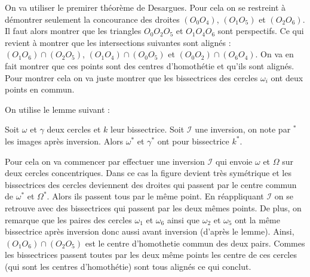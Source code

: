 \begin{sol}



On va utiliser le premirer théorème de Desargues. Pour cela on se restreint à démontrer seulement la concourance des droites $(O_0O_4)$, $(O_1O_5)$ et $(O_2O_6)$. Il faut alors montrer que les triangles $O_0O_2O_5$ et $O_1O_4O_6$ sont perspectifs. Ce qui revient à montrer que les intersections suivantes sont alignés : $(O_1O_6)\cap(O_2O_5)$, $(O_1O_4)\cap (O_0O_5)$ et $(O_0O_2)\cap (O_6O_4)$. On va en fait montrer que ces points sont des centres d'homothétie et qu'ils sont alignés. Pour montrer cela on va juste montrer que les bissectrices des cercles $\omega_i$ ont deux points en commun.

On utilise le lemme suivant :

\begin{lem}
Soit $\omega$ et $\gamma$ deux cercles et $k$ leur bissectrice. Soit $\mathcal{I}$ une inversion, on note par $^*$ les images après inversion. Alors $\omega^*$ et $\gamma^*$ ont pour bissectrice $k^*$.
\end{lem}

Pour cela on va commencer par effectuer une inversion $\mathcal{I}$ qui envoie $\omega$ et $\Omega$ sur deux cercles concentriques. Dans ce cas la figure devient très symétrique et les bissectrices des cercles deviennent des droites qui passent par le centre commun de $\omega^*$ et $\Omega^*$. Alors ils passent tous par le même point. En réappliquant $\mathcal{I}$ on se retrouve avec des bissectrices qui passent par les deux mêmes points. De plus, on remarque que les paires des cercles $\omega_1$ et $\omega_6$ ainsi que $\omega_2$ et $\omega_5$ ont la même bissectrice après inversion donc aussi avant inversion (d'après le lemme). Ainsi, $(O_1O_6)\cap(O_2O_5)$ est le centre d'homothetie commun des deux pairs. Commes les bissectrices passent toutes par les deux même points les centre de ces cercles (qui sont les centres d'homothétie) sont tous alignés ce qui conclut.
\end{sol}

